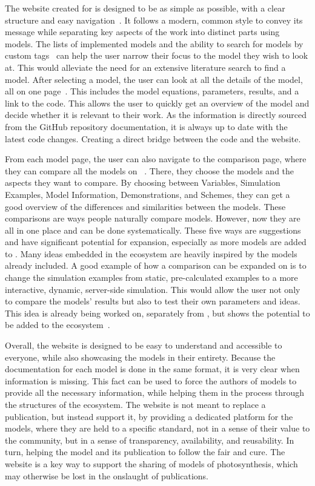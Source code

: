 The website created for \greensloth{} is designed to be as simple as possible, with a clear structure and easy navigation~. It follows a modern, common style to convey its message while separating key aspects of the work into distinct parts using models. The lists of implemented models and the ability to search for models by custom tags~ can help the user narrow their focus to the model they wish to look at. This would alleviate the need for an extensive literature search to find a model. After selecting a model, the user can look at all the details of the model, all on one page~. This includes the model equations, parameters, results, and a link to the code. This allows the user to quickly get an overview of the model and decide whether it is relevant to their work. As the information is directly sourced from the GitHub repository documentation, it is always up to date with the latest code changes. Creating a direct bridge between the code and the website.

From each model page, the user can also navigate to the comparison page, where they can compare all the models on \greensloth{}~. There, they choose the models and the aspects they want to compare. By choosing between Variables, Simulation Examples, Model Information, Demonstrations, and Schemes, they can get a good overview of the differences and similarities between the models. These comparisons are ways people naturally compare models. However, now they are all in one place and can be done systematically. These five ways are suggestions and have significant potential for expansion, especially as more models are added to \greensloth{}. Many ideas embedded in the ecosystem are heavily inspired by the models already included. A good example of how a comparison can be expanded on is to change the simulation examples from static, pre-calculated examples to a more interactive, dynamic, server-side simulation. This would allow the user not only to compare the models' results but also to test their own parameters and ideas. This idea is already being worked on, separately from \greensloth{}, but shows the potential to be added to the ecosystem~\cite{ComputationalBiologyAachenMxlweb2026}.

Overall, the \greensloth{} website is designed to be easy to understand and accessible to everyone, while also showcasing the models in their entirety. Because the documentation for each model is done in the same format, it is very clear when information is missing. This fact can be used to force the authors of models to provide all the necessary information, while helping them in the process through the structures of the \greensloth{} ecosystem. The website is not meant to replace a publication, but instead support it, by providing a dedicated platform for the models, where they are held to a specific standard, not in a sense of their value to the community, but in a sense of transparency, availability, and reusability. In turn, helping the model and its publication to follow the \gls{fair} and \gls{cure}. The website is a key way to support the sharing of models of photosynthesis, which may otherwise be lost in the onslaught of publications.

